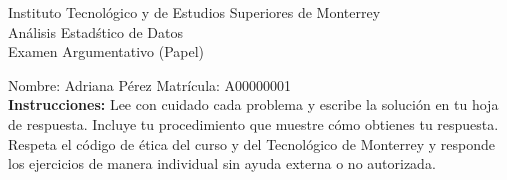 \documentclass[10pt]{report}
\begin{document}
\begin{center}
{\large Instituto Tecnol\'{o}gico y de Estudios Superiores de Monterrey \\
An\'alisis Estad\'stico de Datos } \\
Examen Argumentativo (Papel)
\end{center}

Nombre: \underline{\hspace*{.2in}}
Adriana Pérez
\underline{\hspace*{.2in}} \quad Matr\'icula:\underline{\hspace*{.2in}}
A00000001
\underline{\hspace*{.2in}} \\

{\bf Instrucciones:} Lee con cuidado cada problema y escribe la soluci\'on
en tu hoja de respuesta. Incluye tu procedimiento que muestre c\'omo obtienes tu respuesta.  Respeta el c\'odigo de \'etica del curso y del Tecnol\'ogico de Monterrey y responde los ejercicios de manera individual sin ayuda externa o no autorizada.
\end{document}

